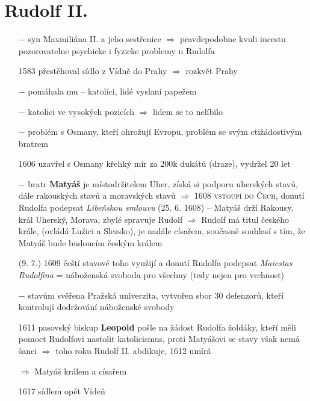 \documentclass{article}
\begin{document}
\section*{Rudolf II.}
\begin{itemize}
    \vspace{-0.5em}
    \setlength\itemsep{0.15em}
    \item[$-$] syn Maxmiliána II. a jeho sestřenice $\Rightarrow$ pravdepodobne kvuli incestu pozorovatelne psychicke i fyzicke problemy u Rudolfa
    \item[1583] přestěhoval sídlo z Vídně do Prahy $\Rightarrow$ rozkvět Prahy
    \item[$-$] pomáhala mu  -- katolíci, lidé vyslaní papežem
    \item[$-$] katolici ve vysokých pozicích $\Rightarrow$ lidem se to nelíbilo


    \item[$-$] problém s Osmany, kteří ohrožují Evropu, problém se svým ctižádostivým bratrem
    \item[1606] uzavřel s Osmany křehký mír za 200k dukátů (draze), vydržel 20 let
    \item[$-$] bratr \textbf{Matyáš} je místodržitelem Uher, získá si podporu uherských stavů, dále rakouských stavů a moravských stavů $\Rightarrow$ 1608 \textsc{vstoupí do Čech}, donutí Rudolfa podepsat \textit{Libeňskou smlouvu} (25. 6. 1608) -- Matyáš drží Rakousy, král Uherský, Morava, zbylé spravuje Rudolf $\Rightarrow$ Rudolf má titul českého krále, (ovládá Lužici a Slezsko), je nadále císařem, současně souhlasí s tím, že Matyáš bude budoucím českým králem

    \item[(9. 7.) 1609] čeští stavové toho využijí a donutí Rudolfa podepsat \textit{Maiestas Rudolfina} = náboženská svoboda pro všechny (tedy nejen pro vrchnost)
    \item[$-$] stavům svěřena Pražská univerzita, vytvořen sbor 30 defenzorů, kteří kontrolují dodržování náboženské svobody

    \item[1611] pasovský biskup \textbf{Leopold} pošle na žádost Rudolfa žoldáky, kteří měli pomoct Rudolfovi nastolit katolicismus, proti Matyášovi se stavy však nemá šanci $\Rightarrow$ toho roku Rudolf II. abdikuje, 1612 umírá
    \item[$\Rightarrow$]  Matyáš králem a císařem
    \item[1617]  sídlem opět Vídeň


\end{itemize}
\end{document}
